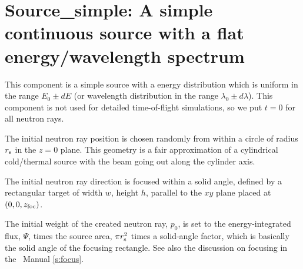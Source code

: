 \section{Source\_simple: A simple continuous source 
with a flat energy/wavelength spectrum}
\label{source-simple}


This component is 
a simple source with a energy distribution which is uniform
in the range $E_0 \pm dE$ 
(or wavelength distribution in the range $\lambda_0 \pm d\lambda$).
This component is not used for detailed time-of-flight simulations,
so we put $t=0$ for all neutron rays.

The initial neutron ray position is chosen randomly from within a
circle of radius $r_{\rm s}$ in the $z=0$ plane. 
This geometry is a fair approximation
of a cylindrical cold/thermal source with the beam going out along
the cylinder axis.

The initial neutron ray direction is focused within
a solid angle, defined by a rectangular target of width
$w$, height $h$, parallel to 
the $xy$ plane placed at $(0,0,z_{\rm foc})$. 

The initial weight of the created neutron ray, $p_0$, is set to the
energy-integrated flux, $\Psi$, times the source area, $\pi r_{\rm s}^2$
times a solid-angle factor, which is basically the
solid angle of the focusing rectangle.
See also the discussion on focusing in the \MCS\ Manual \ref{s:focus}. 

